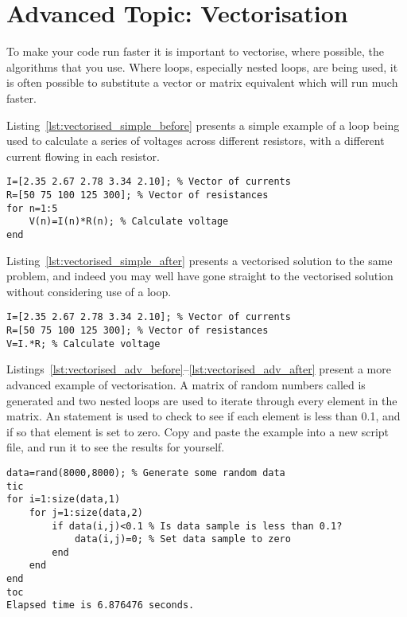 \chapter{Advanced Topic: Vectorisation}\label{chap:vectorisation}

To make your \mlab code run faster it is important to vectorise, where possible, the algorithms that you use. Where loops, especially nested loops, are being used, it is often possible to substitute a vector or matrix equivalent which will run much faster. 

Listing~\ref{lst:vectorised_simple_before} presents a simple example of a  loop being used to calculate a series of voltages across different resistors, with a different current flowing in each resistor.
\begin{lstlisting}[caption={Simple \mcode{for} loop to vectorise},label=lst:vectorised_simple_before]
I=[2.35 2.67 2.78 3.34 2.10]; % Vector of currents
R=[50 75 100 125 300]; % Vector of resistances
for n=1:5
    V(n)=I(n)*R(n); % Calculate voltage
end
\end{lstlisting}
Listing~\ref{lst:vectorised_simple_after} presents a vectorised solution to the same problem, and indeed you may well have gone straight to the vectorised solution without considering use of a loop.
\begin{lstlisting}[caption={Vectorised \mcode{for} loop},label=lst:vectorised_simple_after]
I=[2.35 2.67 2.78 3.34 2.10]; % Vector of currents
R=[50 75 100 125 300]; % Vector of resistances
V=I.*R; % Calculate voltage
\end{lstlisting}

Listings~\ref{lst:vectorised_adv_before}--\ref{lst:vectorised_adv_after} present a more advanced example of vectorisation. A matrix of random numbers called  is generated and two nested  loops are used to iterate through every element in the matrix. An  statement is used to check to see if each element is less than 0.1, and if so that element is set to zero. Copy and paste the example into a new script file, and run it to see the results for yourself.
\begin{lstlisting}[caption={Nested loops},label=lst:vectorised_adv_before]
data=rand(8000,8000); % Generate some random data
tic
for i=1:size(data,1)
	for j=1:size(data,2)
		if data(i,j)<0.1 % Is data sample is less than 0.1?
			data(i,j)=0; % Set data sample to zero
		end
	end
end
toc
Elapsed time is 6.876476 seconds.
\end{lstlisting}

